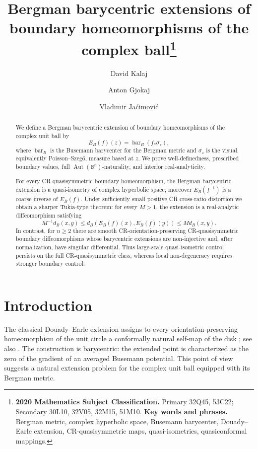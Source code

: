 \documentclass[11pt]{article}
\title{Bergman barycentric extensions of boundary homeomorphisms of the complex ball\thanks{\textbf{2020 Mathematics Subject Classification.} Primary 32Q45, 53C22; Secondary 30L10, 32V05, 32M15, 51M10. \textbf{Key words and phrases.} Bergman metric, complex hyperbolic space, Busemann barycenter, Douady--Earle extension, CR-quasisymmetric maps, quasi-isometries, quasiconformal mappings.}}
\author{David Kalaj \and Anton Gjokaj \and Vladimir Ja\'cimovi\'c}
\date{}
\theoremstyle{definition}
\theoremstyle{remark}
\theoremstyle{definition}
\newcommand{\B}{\mathbb B}
\newcommand{\Aut}{\operatorname{Aut}}
\newcommand{\barB}{\operatorname{bar}_{B}}
\begin{document}
\maketitle

\begin{abstract}
We define a Bergman barycentric extension of boundary homeomorphisms of the
complex unit ball by
\[
        E_B(f)(z)=\barB(f_*\sigma_z),
\]
where \(\barB\) is the Busemann barycenter for the Bergman metric and
\(\sigma_z\) is the visual, equivalently Poisson--Szeg\H{o}, measure based at
\(z\).  We prove well-definedness, prescribed boundary values, full
\(\Aut(\B^n)\)-naturality, and interior real-analyticity.

For every CR-quasisymmetric boundary homeomorphism, the Bergman barycentric
extension is a quasi-isometry of complex hyperbolic space; moreover
\(E_B(f^{-1})\) is a coarse inverse of \(E_B(f)\).  Under sufficiently small
positive CR cross-ratio distortion we obtain a sharper Tukia-type theorem:
for every \(M>1\), the extension is a real-analytic diffeomorphism satisfying
\[
        M^{-1}d_B(x,y)\le d_B(E_B(f)(x),E_B(f)(y))\le M d_B(x,y).
\]
In contrast, for \(n\ge2\) there are smooth CR-orientation-preserving
CR-quasisymmetric boundary diffeomorphisms whose barycentric extensions are
non-injective and, after normalization, have singular differential.  Thus
large-scale quasi-isometric control persists on the full CR-quasisymmetric
class, whereas local non-degeneracy requires stronger boundary control.
\end{abstract}



\section{Introduction}

The classical Douady--Earle extension assigns to every orientation-preserving
homeomorphism of the unit circle a conformally natural self-map of the disk
\cite{DE}; see also \cite{Petersen}.  The construction is barycentric: the
extended point is characterized as the zero of the gradient of an averaged
Busemann potential.  This point of view suggests a natural extension problem
for the complex unit ball equipped with its Bergman metric.
\end{document}
